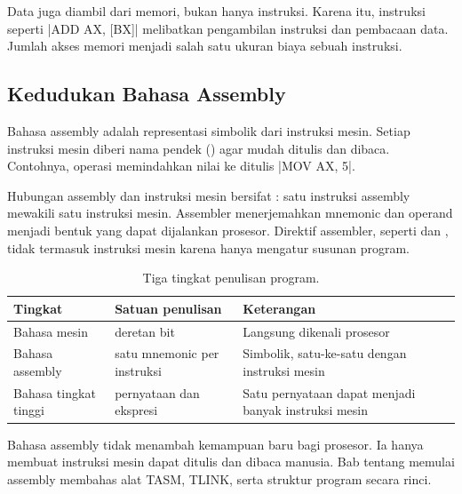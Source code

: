 \begin{infobox}
\vspace{1.1em}
Data juga diambil dari memori, bukan hanya instruksi. Karena itu,
instruksi seperti \lstasm|ADD AX, [BX]| melibatkan pengambilan
instruksi dan pembacaan data. Jumlah akses memori menjadi salah satu
ukuran biaya sebuah instruksi.
\end{infobox}

\subsection{Kedudukan Bahasa Assembly}

Bahasa assembly adalah representasi simbolik dari instruksi mesin.
Setiap instruksi mesin diberi nama pendek () agar mudah
ditulis dan dibaca. Contohnya, operasi memindahkan nilai ke 
ditulis \lstasm|MOV AX, 5|.

Hubungan assembly dan instruksi mesin bersifat :
satu instruksi assembly mewakili satu instruksi mesin. Assembler
menerjemahkan mnemonic dan operand menjadi bentuk yang dapat
dijalankan prosesor. Direktif assembler, seperti  dan
, tidak termasuk instruksi mesin karena hanya mengatur
susunan program.

\begin{table}[H]
    \centering
    \caption{Tiga tingkat penulisan program.}
    \label{tab:tiga-tingkat}
    \small
    \begin{tabular}{@{}p{3.0cm}p{4.0cm}p{6.4cm}@{}}
        \toprule
        \textbf{Tingkat} & \textbf{Satuan penulisan} &
        \textbf{Keterangan} \\
        \midrule
        Bahasa mesin & deretan bit & Langsung dikenali prosesor \\
        \addlinespace
        Bahasa assembly & satu mnemonic per instruksi &
        Simbolik, satu-ke-satu dengan instruksi mesin \\
        \addlinespace
        Bahasa tingkat tinggi & pernyataan dan ekspresi &
        Satu pernyataan dapat menjadi banyak instruksi mesin \\
        \bottomrule
    \end{tabular}
\end{table}

Bahasa assembly tidak menambah kemampuan baru bagi prosesor. Ia hanya
membuat instruksi mesin dapat ditulis dan dibaca manusia. Bab tentang
memulai assembly membahas alat TASM, TLINK, serta struktur program
secara rinci.
